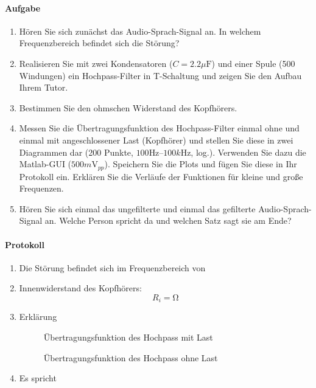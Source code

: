 \documentclass[10pt]{scrreprt}
\begin{document}
    \paragraph{Aufgabe}
    \begin{enumerate}
        \item Hören Sie sich zunächst das Audio-Sprach-Signal an. In welchem Frequenzbereich
            befindet sich die Störung?
        \item Realisieren Sie mit zwei Kondensatoren ($C = 2.2 \si{\mu\farad}$) und einer Spule (500 Windungen)
            ein Hochpass-Filter in T-Schaltung und zeigen Sie den Aufbau Ihrem Tutor.
        \item Bestimmen Sie den ohmschen Widerstand des Kopfhörers.
        \item Messen Sie die Übertragungsfunktion des Hochpass-Filter einmal ohne und einmal
            mit angeschlossener Last (Kopfhörer) und stellen Sie diese in zwei Diagrammen
            dar (200 Punkte, $100\si{\hertz}$–$100\si{k\hertz}$, log.). Verwenden Sie dazu die Matlab-GUI
            ($500\si{m\volt}_{pp}$). Speichern Sie die Plots und fügen Sie diese in Ihr Protokoll ein. Erklären
            Sie die Verläufe der Funktionen für kleine und große Frequenzen.
        \item Hören Sie sich einmal das ungefilterte und einmal das gefilterte Audio-Sprach-Signal
            an. Welche Person spricht da und welchen Satz sagt sie am Ende?
    \end{enumerate}

    \paragraph{Protokoll}
    \begin{enumerate}
        \item Die Störung befindet sich im Frequenzbereich von
        \item
            Innenwiderstand des Kopfhörers:
            \begin{equation*}
                R_i = \si{\ohm}
            \end{equation*}
        \item
            Erklärung
            \begin{center}
                \begin{figure}[H]
                    \caption{Übertragungsfunktion des Hochpass mit Last}
                \end{figure}
            \end{center}
            \begin{center}
                \begin{figure}[H]
                    \caption{Übertragungsfunktion des Hochpass ohne Last}
                \end{figure}
            \end{center}
        \item Es spricht
    \end{enumerate}
\end{document}
